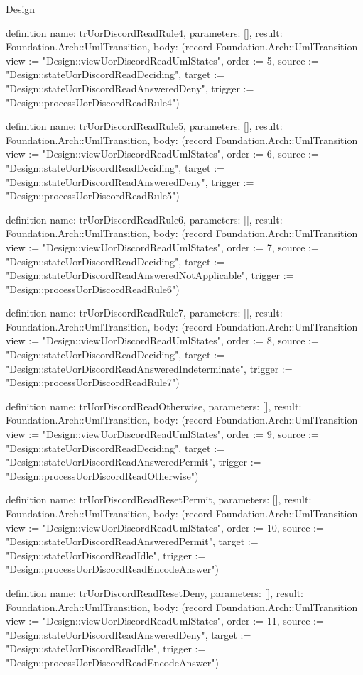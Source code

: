 \begin{lexlean}{Design}
\begin{semanticmodule}
definition{
  name: trUorDiscordReadRule4,
  parameters: [],
  result: Foundation.Arch::UmlTransition,
  body: (record Foundation.Arch::UmlTransition {view := "Design::viewUorDiscordReadUmlStates", order := 5, source := "Design::stateUorDiscordReadDeciding", target := "Design::stateUorDiscordReadAnsweredDeny", trigger := "Design::processUorDiscordReadRule4"})
}

definition{
  name: trUorDiscordReadRule5,
  parameters: [],
  result: Foundation.Arch::UmlTransition,
  body: (record Foundation.Arch::UmlTransition {view := "Design::viewUorDiscordReadUmlStates", order := 6, source := "Design::stateUorDiscordReadDeciding", target := "Design::stateUorDiscordReadAnsweredDeny", trigger := "Design::processUorDiscordReadRule5"})
}

definition{
  name: trUorDiscordReadRule6,
  parameters: [],
  result: Foundation.Arch::UmlTransition,
  body: (record Foundation.Arch::UmlTransition {view := "Design::viewUorDiscordReadUmlStates", order := 7, source := "Design::stateUorDiscordReadDeciding", target := "Design::stateUorDiscordReadAnsweredNotApplicable", trigger := "Design::processUorDiscordReadRule6"})
}

definition{
  name: trUorDiscordReadRule7,
  parameters: [],
  result: Foundation.Arch::UmlTransition,
  body: (record Foundation.Arch::UmlTransition {view := "Design::viewUorDiscordReadUmlStates", order := 8, source := "Design::stateUorDiscordReadDeciding", target := "Design::stateUorDiscordReadAnsweredIndeterminate", trigger := "Design::processUorDiscordReadRule7"})
}

definition{
  name: trUorDiscordReadOtherwise,
  parameters: [],
  result: Foundation.Arch::UmlTransition,
  body: (record Foundation.Arch::UmlTransition {view := "Design::viewUorDiscordReadUmlStates", order := 9, source := "Design::stateUorDiscordReadDeciding", target := "Design::stateUorDiscordReadAnsweredPermit", trigger := "Design::processUorDiscordReadOtherwise"})
}

definition{
  name: trUorDiscordReadResetPermit,
  parameters: [],
  result: Foundation.Arch::UmlTransition,
  body: (record Foundation.Arch::UmlTransition {view := "Design::viewUorDiscordReadUmlStates", order := 10, source := "Design::stateUorDiscordReadAnsweredPermit", target := "Design::stateUorDiscordReadIdle", trigger := "Design::processUorDiscordReadEncodeAnswer"})
}

definition{
  name: trUorDiscordReadResetDeny,
  parameters: [],
  result: Foundation.Arch::UmlTransition,
  body: (record Foundation.Arch::UmlTransition {view := "Design::viewUorDiscordReadUmlStates", order := 11, source := "Design::stateUorDiscordReadAnsweredDeny", target := "Design::stateUorDiscordReadIdle", trigger := "Design::processUorDiscordReadEncodeAnswer"})
}


\end{semanticmodule}
\end{lexlean}

